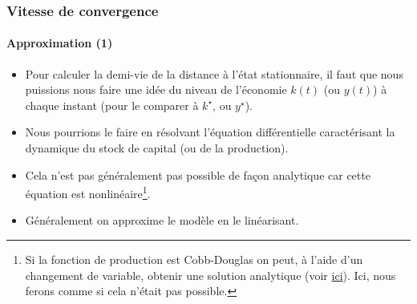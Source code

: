 \documentclass[10pt,notheorems]{beamer}
\theoremstyle{plain}
\theoremstyle{definition} %
\begin{document}
\begin{frame}
  \frametitle{Vitesse de convergence}
  \framesubtitle{Approximation (1)}

  \begin{itemize}

  \item Pour calculer la demi-vie de la distance à l'état stationnaire, il faut
    que nous puissions nous faire une idée du niveau de l'économie $k(t)$ (ou
    $y(t)$) à chaque instant (pour le comparer à $k^\star$, ou
    $y^{\star}$).\newline

  \item Nous pourrions le faire en résolvant l'équation différentielle
    caractérisant la dynamique du stock de capital (ou de la
    production).\newline

  \item Cela n'est pas généralement pas possible de façon analytique car cette
    équation est nonlinéaire\footnote[frame]{Si la fonction de production est
      Cobb-Douglas on peut, à l'aide d'un changement de variable, obtenir une solution analytique (voir
      \href{https://stephane-adjemian.fr/posts/simulation-du-modele-de-solow/}{ici}).
      Ici, nous ferons comme si cela n'était pas possible.}.\newline

  \item Généralement on approxime le modèle en le linéarisant.

  \end{itemize}

\end{frame}
\end{document}
